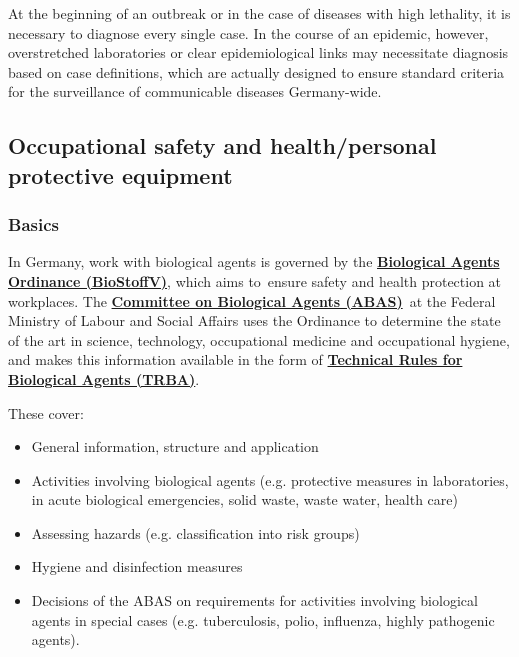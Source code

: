 \documentclass{article}
\begin{document}
At the beginning of an outbreak or in the case of diseases with high lethality, it is necessary to diagnose every single case. In the course of an epidemic, however, overstretched laboratories or clear epidemiological links may necessitate diagnosis based on case definitions, which are actually designed to ensure standard criteria for the surveillance of communicable diseases Germany-wide.


\subsection{Occupational safety and health/personal protective equipment}\label{H9439037}



\subsubsection{Basics}\label{H8927926}



In Germany, work with biological agents is governed by the \textbf{\href{http://www.gesetze-im-internet.de/englisch_biostoffv/englisch_biostoffv.pdf}{Biological Agents Ordinance (BioStoffV)}},\textbf{ }which aims to ensure safety and health protection at workplaces. The \textbf{\href{https://www.baua.de/EN/Tasks/Committee-administration/ABAS/ABAS_node.html}{Committee on Biological Agents (ABAS)}} at the\textbf{ }Federal Ministry of Labour and Social Affairs\textbf{ }uses the Ordinance to determine the state of the art in science, technology, occupational medicine and occupational hygiene, and makes this information available in the form of \textbf{\href{https://www.baua.de/EN/Service/Legislative-texts-and-technical-rules/Rules/TRBA/TRBA.html}{Technical Rules for}} \textbf{\href{https://www.baua.de/EN/Service/Legislative-texts-and-technical-rules/Rules/TRBA/TRBA.html}{Biological Agents (TRBA)}}.


These cover:

\begin{itemize}
\item General information, structure and application


\item Activities involving biological agents (e.g. protective measures in laboratories, in acute biological emergencies, solid waste, waste water, health care)


\item Assessing hazards (e.g. classification into risk groups)


\item Hygiene and disinfection measures


\item Decisions of the ABAS on requirements for activities involving biological agents in special cases (e.g. tuberculosis, polio, influenza, highly pathogenic agents).


\end{itemize}
\end{document}
